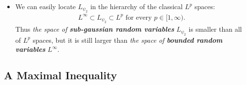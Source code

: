 \documentclass[11pt]{article}
\begin{document}
\begin{itemize}
\item \begin{remark}
We can easily locate $L_{\psi_2}$ in the hierarchy of the classical $L^p$ spaces:
\begin{align*}
L^{\infty} \subset L_{\psi_2} \subset L^p \text{ for every $p \in [1, \infty)$}.
\end{align*} Thus \emph{the space of \textbf{sub-gaussian random variables}} $L_{\psi_2}$ is smaller than all of $L^p$ spaces, but it is still larger than \emph{the space of \textbf{bounded random variables}} $L^{\infty}$.
\end{remark}
\end{itemize}

\subsection{A Maximal Inequality}
\end{document}
